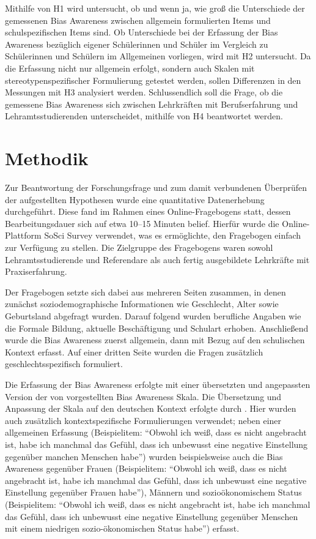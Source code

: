 Mithilfe von H1 wird untersucht, ob und wenn ja, wie groß die Unterschiede der gemessenen Bias Awareness zwischen allgemein formulierten Items und schulspezifischen Items sind.
Ob Unterschiede bei der Erfassung der Bias Awareness bezüglich eigener Schülerinnen und Schüler im Vergleich zu Schülerinnen und Schülern im Allgemeinen vorliegen, wird mit H2 untersucht.
Da die Erfassung nicht nur allgemein erfolgt, sondern auch Skalen mit stereotypenspezifischer Formulierung getestet werden, sollen Differenzen in den Messungen mit H3 analysiert werden.
Schlussendlich soll die Frage, ob die gemessene Bias Awareness sich zwischen Lehrkräften mit Berufserfahrung und Lehramtsstudierenden unterscheidet, mithilfe von H4 beantwortet werden.


\section{Methodik}
\label{sec:methodik}

Zur Beantwortung der Forschungsfrage und zum damit verbundenen Überprüfen der aufgestellten Hypothesen wurde eine quantitative Datenerhebung durchgeführt.
Diese fand im Rahmen eines Online-Fragebogens statt, dessen Bearbeitungsdauer sich auf etwa 10--15 Minuten belief.
Hierfür wurde die Online-Plattform SoSci Survey \citep{leiner2024sosci} verwendet, was es ermöglichte, den Fragebogen einfach zur Verfügung zu stellen.
Die Zielgruppe des Fragebogens waren sowohl Lehramtsstudierende und Referendare als auch fertig ausgebildete Lehrkräfte mit Praxiserfahrung.

Der Fragebogen setzte sich dabei aus mehreren Seiten zusammen, in denen zunächst soziodemographische Informationen wie Geschlecht, Alter sowie Geburtsland abgefragt wurden.
Darauf folgend wurden berufliche Angaben wie die Formale Bildung, aktuelle Beschäftigung und Schulart erhoben.
Anschließend wurde die Bias Awareness zuerst allgemein, dann mit Bezug auf den schulischen Kontext erfasst.
Auf einer dritten Seite wurden die Fragen zusätzlich geschlechtsspezifisch formuliert.

Die Erfassung der Bias Awareness erfolgte mit einer übersetzten und angepassten Version der von \citet{perry2015modern} vorgestellten Bias Awareness Skala.
Die Übersetzung und Anpassung der Skala auf den deutschen Kontext erfolgte durch \citet{bonefeld2022reflexion}.
Hier wurden auch zusätzlich kontextspezifische Formulierungen verwendet; neben einer allgemeinen Erfassung (Beispielitem: ``Obwohl ich weiß, dass es nicht angebracht ist, habe ich manchmal das Gefühl, dass ich unbewusst eine negative Einstellung gegenüber manchen Menschen habe'') wurden beispielsweise auch die Bias Awareness gegenüber Frauen (Beispielitem: ``Obwohl ich weiß, dass es nicht angebracht ist, habe ich manchmal das Gefühl, dass ich unbewusst eine negative Einstellung gegenüber Frauen habe''), Männern und sozioökonomischem Status (Beispielitem: ``Obwohl ich weiß, dass es nicht angebracht ist, habe ich manchmal das Gefühl, dass ich unbewusst eine negative Einstellung gegenüber Menschen mit einem niedrigen sozio-ökonomischen Status habe'') erfasst.

